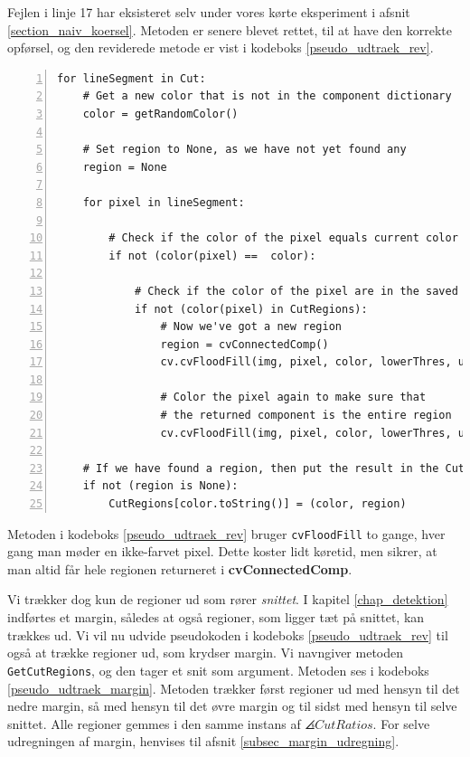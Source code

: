 {Fejlen i linje 17 har eksisteret selv under vores kørte eksperiment i
afsnit \ref{section_naiv_koersel}. Metoden er senere blevet rettet, til
at have den korrekte opførsel, og den reviderede metode er vist i
kodeboks \ref{pseudo_udtraek_rev}.

\begin{lstlisting}[caption={Revideret pseudokode til udtrækning af
    regioner. Returnerer ingen
    duplikater.},captionpos=b,label={pseudo_udtraek_rev},numbers=left,
    frame=tb, breaklines=false, float=h]
for lineSegment in Cut:
    # Get a new color that is not in the component dictionary
    color = getRandomColor()

    # Set region to None, as we have not yet found any
    region = None

    for pixel in lineSegment:

        # Check if the color of the pixel equals current color
        if not (color(pixel) ==  color):

            # Check if the color of the pixel are in the saved regions
            if not (color(pixel) in CutRegions):
                # Now we've got a new region
                region = cvConnectedComp()
                cv.cvFloodFill(img, pixel, color, lowerThres, upperThres, region)

                # Color the pixel again to make sure that
                # the returned component is the entire region
                cv.cvFloodFill(img, pixel, color, lowerThres, upperThres, region)

    # If we have found a region, then put the result in the CutRegions-dictionary
    if not (region is None):
        CutRegions[color.toString()] = (color, region)
\end{lstlisting}

Metoden i kodeboks \ref{pseudo_udtraek_rev} bruger \texttt{cvFloodFill}
to gange, hver gang man møder en ikke-farvet pixel. Dette koster lidt
køretid, men sikrer, at man altid får hele regionen returneret i
\textbf{cvConnectedComp}.


Vi trækker dog kun de regioner ud som rører \emph{snittet}. I kapitel
\ref{chap_detektion} indførtes et margin, således at også regioner, som
ligger tæt på snittet, kan trækkes ud. Vi vil nu udvide pseudokoden i
kodeboks \ref{pseudo_udtraek_rev} til også at trække regioner ud, som
krydser margin. Vi navngiver metoden \texttt{GetCutRegions}, og den
tager et snit som argument. Metoden ses i kodeboks
\ref{pseudo_udtraek_margin}. Metoden trækker først regioner ud med
hensyn til det nedre margin, så med hensyn til det øvre margin og til
sidst med hensyn til selve snittet. Alle regioner gemmes i den samme
instans af $\angles{CutRatios}$. For selve udregningen af margin,
henvises til afsnit \ref{subsec_margin_udregning}.

}
